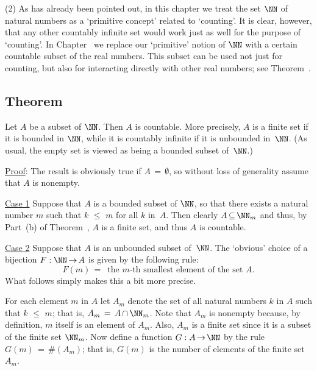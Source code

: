 \V

        (2) As has already been pointed out, in this chapter we treat the set ${\NN}$ of natural numbers as a `primitive concept' related to `counting'.
    It is clear, however, that any other countably infinite set would work just as well for the purpose of `counting'.
    In Chapter~ we replace our `primitive' notion of ${\NN}$ with a certain countable subset of the real numbers.
    This subset can be used not just for counting, but also for interacting directly with other real numbers; see Theorem~.

\V
\V

            \subsection{\small{\bf Theorem}}
            \label{ThmA20.10}

        Let $A$ be a subset of ${\NN}$. Then $A$ is countable. More precisely, $A$ is a finite set if it is bounded in ${\NN}$,
    while it is countably infinite if it is unbounded in~${\NN}$. (As usual, the empty set is viewed as being a bounded subset of~${\NN}$.)

\V

        \underline{Proof}: The result is obviously true if $A \,=\, {\emptyset}$, so without loss of generality assume that $A$ is nonempty.

\V

         \underline{Case 1} Suppose that $A$ is a bounded subset of ${\NN}$, so that
    there exists a natural number $m$ such that $k\,\,{\leq}\,\,m$ for all $k$ in~$A$.
    Then clearly $A \,{\subseteq}\, {\NN}_{m}$ and thus, by Part~(b) of Theorem~, $A$ is a finite set, and thus $A$ is countable.

        \underline{Case 2} Suppose that $A$ is an unbounded subset of~${\NN}$. The `obvious' choice of a bijection
    $F:{\NN} \,{\rightarrow}\, A$ is given by the following rule:
        \begin{displaymath}
        F(m) \,=\, \mbox{ the $m$-th smallest element of the set $A$}.
        \end{displaymath}
    What follows simply makes this a bit more precise.

        For each element $m$ in $A$ let $A_{m}$ denote the set of all natural numbers $k$ in $A$ such that $k\,\,{\leq}\,\,m$;
    that is, $A_{m} \,=\, A\,{\cap}\,{\NN}_{m}$. Note that $A_{m}$ is nonempty because, by definition, $m$ itself is an element of $A_{m}$.
    Also, $A_{m}$ is a finite set since it is a subset of the finite set ${\NN}_{m}$.
    Now define a function $G:A \,{\rightarrow}\, {\NN}$ by the rule $G(m) \,=\, \#(A_{m})$; that is, $G(m)$ is the number of elements of the finite set~$A_{m}$.

